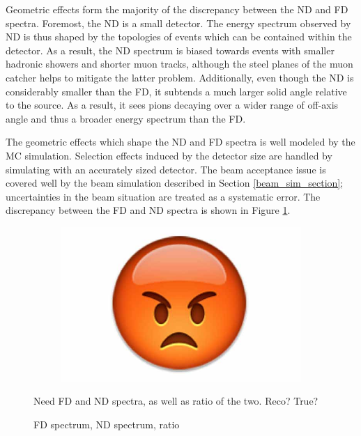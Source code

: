 Geometric effects form the majority of the discrepancy between the
ND and FD spectra.
Foremost, the ND is a small detector.
The energy spectrum observed by ND is thus shaped by the topologies
of events which can be contained within the detector.
As a result, the ND spectrum is biased towards events with
smaller hadronic showers and shorter muon tracks, although the steel planes
of the muon catcher helps to mitigate the latter problem.
Additionally, even though the ND is considerably smaller than the FD,
it subtends a much larger solid angle relative to the \numi source.
As a result, it sees pions decaying over a wider range of off-axis angle
and thus a broader energy spectrum than the FD.

The geometric effects which shape the ND and FD spectra is well modeled
by the MC simulation.
Selection effects induced by the detector size are handled by simulating
with an accurately sized detector.
The beam acceptance issue is covered well by the beam simulation described in
Section \ref{beam_sim_section}; uncertainties in the beam situation are
treated as a systematic error.
The discrepancy between the FD and ND spectra is shown in Figure
\ref{ratioNDFD}.

\begin{figure}
\begin{center}
  \begin{subfigure}[b]{0.45\textwidth}
    \centering
    \includegraphics[width=\textwidth]{figures/dummy/dummy}
  \end{subfigure}

\end{center}
\caption{FD spectrum, ND spectrum, ratio}{
Need FD and ND spectra, as well as ratio of the two.  Reco?  True?
}
\label{ratioNDFD}
\end{figure}

